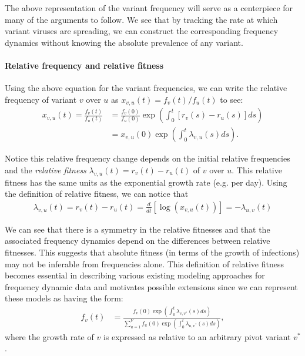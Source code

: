 \documentclass[11pt,oneside,letterpaper]{article}
\begin{document}
The above representation of the variant frequency will serve as a centerpiece for many of the arguments to follow.
We see that by tracking the rate at which variant viruses are spreading, we can construct the corresponding frequency dynamics without knowing the absolute prevalence of any variant.

\paragraph{Relative frequency and relative fitness}%

Using the above equation for the variant frequencies, we can write the relative frequency of variant $v$ over $u$ as $x_{v,u}(t) = f_{v}(t) / f_{u}(t)$ to see:
\begin{align*}
    x_{v, u}(t) = \frac{f_{v}(t)}{f_{u}(t)} &= \frac{f_{v}(0)}{f_{u}(0)} \exp \left( \int_{0}^{t} [r_{v}(s) - r_{u}(s)] ds \right)\\
                                            &=x_{v,u}(0)\exp \left( \int_{0}^{t} \lambda_{v,u}(s) ds \right).
\end{align*}

Notice this relative frequency change depends on the initial relative frequencies and the \emph{relative fitness} $\lambda_{v,u}(t) = r_{v}(t) - r_{u}(t)$ of $v$ over $u$.
This relative fitness has the same units as the exponential growth rate (e.g. per day).
Using the definition of relative fitness, we can notice that
\begin{align}
\lambda_{v, u}(t) = r_{v}(t) - r_{u}(t) = \frac{d }{d t} \left[\log \left( x_{v,u}(t) \right) \right] = - \lambda_{u,v}(t)
\end{align}

We can see that there is a symmetry in the relative fitnesses and that the associated frequency dynamics depend on the differences between relative fitnesses.
This suggests that absolute fitness (in terms of the growth of infections) may not be inferable from frequencies alone.
This definition of relative fitness becomes essential in describing various existing modeling approaches for frequency dynamic data and motivates possible extensions since we can represent these models as having the form:
\begin{align}
    f_{v}(t) &= \frac{ f_{v}(0) \exp( \int_{0}^{t} \lambda_{v, v^*}(s) ds)}{\sum_{u=1}^{V}  f_{u}(0) \exp( \int_{0}^{t} \lambda_{u, v^*}(s) ds)},
\end{align}
where the growth rate of $v$ is expressed as relative to an arbitrary pivot variant $v^*$.
\end{document}
